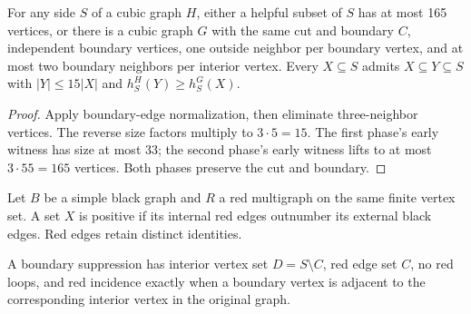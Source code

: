 \begin{theorem}
  \label{thm:lowerbounds-algebraic-complete-normalization}
  \leanok
  For any side $S$ of a cubic graph $H$, either a helpful subset of $S$
  has at most 165 vertices, or there is a cubic graph $G$ with the same
  cut and boundary $C$, independent boundary vertices, one outside neighbor
  per boundary vertex, and at most two boundary neighbors per interior vertex.
  Every $X\subseteq S$ admits $X\subseteq Y\subseteq S$ with
  $|Y|\le15|X|$ and $h^H_S(Y)\ge h^G_S(X)$.
\end{theorem}
\begin{proof}
  \leanok
  Apply boundary-edge normalization, then eliminate three-neighbor vertices.
  The reverse size factors multiply to $3\cdot5=15$. The first phase's
  early witness has size at most 33; the second phase's early witness lifts
  to at most $3\cdot55=165$ vertices. Both phases preserve the cut and boundary.
\end{proof}

\begin{definition}
  \label{def:lowerbounds-algebraic-red-black}
  \leanok
  Let $B$ be a simple black graph and $R$ a red multigraph on the same
  finite vertex set. A set $X$ is positive if its internal red edges
  outnumber its external black edges. Red edges retain distinct identities.
\end{definition}

\begin{definition}
  \label{def:lowerbounds-algebraic-suppression}
  \leanok
  A boundary suppression has interior vertex set $D=S\setminus C$,
  red edge set $C$, no red loops, and red incidence exactly when a boundary
  vertex is adjacent to the corresponding interior vertex in the original graph.
\end{definition}

